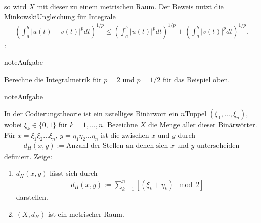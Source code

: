 \documentclass[letterpaper,10pt,english]{jupyterBook}
\begin{document}
so wird \(X\) mit dieser  zu einem metrischen Raum. Der Beweis nutzt die Minkowski\sphinxhyphen{}Ungleichung für Integrale
\begin{equation*}
\begin{split}\left(\int_a^b |u(t)-v(t)|^p dt\right)^{1/p} \le \left(\int_a^b |u(t)|^p dt\right)^{1/p} + \left(\int_a^b |v(t)|^p dt\right)^{1/p}.\end{split}
\end{equation*}
:

\noindent{}

\begin{sphinxadmonition}{note}{Aufgabe}

Berechne die Integralmetrik für \(p=2\) und \(p=1/2\) für das Beispiel oben.
\end{sphinxadmonition}

\begin{sphinxadmonition}{note}{Aufgabe}

In der Codierungstheorie ist ein \(n\)\sphinxhyphen{}stelliges Binärwort ein \(n\)\sphinxhyphen{}Tuppel \((\xi_1, \ldots, \xi_n)\), wobei \(\xi_k \in \{0,1\}\) für \(k=1,\ldots, n\). Bezeichne \(X\) die Menge aller dieser Binärwörter. Für \(x = \xi_1 \xi_2 \ldots \xi_n\), \(y = \eta_1 \eta_2 \ldots \eta_n\) ist die  zwischen \(x\) und \(y\) durch
\begin{equation*}
\begin{split}d_H(x,y) := \text{Anzahl der Stellen an denen sich $x$ und $y$ unterscheiden}\end{split}
\end{equation*}
definiert. Zeige:
\begin{enumerate}
%
\item {} 
\(d_H(x,y)\) lässt sich durch
\begin{equation*}
\begin{split}d_H(x,y) := \sum_{k=1}^n [(\xi_k+\eta_k) \mod 2]\end{split}
\end{equation*}
darstellen.

\item {} 
\((X,d_H)\) ist ein metrischer Raum.

\end{enumerate}
\end{sphinxadmonition}
\end{document}

